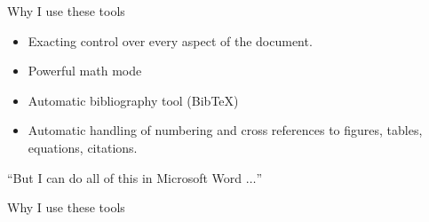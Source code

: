 \documentclass[12pt]{beamer}
\begin{document}
\begin{frame}{Why I use these tools}

\begin{itemize}
\item{Exacting control over every aspect of the document.}
\item{Powerful math mode}
\item{Automatic bibliography tool (Bib\TeX)}
\item{Automatic handling of numbering and cross references to figures, tables, equations, citations.}
\end{itemize}

\pause
``But I can do all of this in Microsoft Word $\dots$''

\end{frame}

\begin{frame}{Why I use these tools}

\end{frame}

\end{document}
